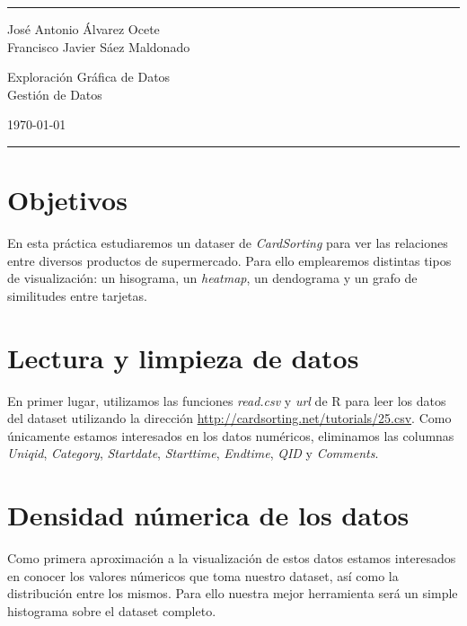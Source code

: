 \documentclass[a4paper]{article}
\begin{document}

\fancyhead[C]{}
\hrule \medskip %
\begin{minipage}{0.295\textwidth} 
	\raggedright
	\footnotesize
	José Antonio Álvarez Ocete \hfill\\   
	Francisco Javier Sáez Maldonado \hfill
\end{minipage}
\begin{minipage}{0.4\textwidth} 
	\centering 
	\large 
	Exploración Gráfica de Datos \\ 
	\normalsize 
	Gestión de Datos \\ 
\end{minipage}
\begin{minipage}{0.295\textwidth} 
	\raggedleft
	\today\hfill\\
\end{minipage}
\medskip\hrule 
\bigskip


\section{Objetivos}

En esta práctica estudiaremos un dataser de \emph{CardSorting} para ver las relaciones entre diversos productos de supermercado. Para ello emplearemos distintas tipos de visualización: un hisograma, un \emph{heatmap}, un dendograma y un grafo de similitudes entre tarjetas.

\section{Lectura y limpieza de datos}

En primer lugar, utilizamos las funciones \emph{read.csv} y \emph{url} de R para leer los datos del dataset utilizando la dirección \url{http://cardsorting.net/tutorials/25.csv}. Como únicamente estamos interesados en los datos numéricos, eliminamos las columnas \emph{Uniqid}, \emph{Category}, \emph{Startdate}, \emph{Starttime}, \emph{Endtime}, \emph{QID} y \emph{Comments}.

\section{Densidad númerica de los datos}

Como primera aproximación a la visualización de estos datos estamos interesados en conocer los valores númericos que toma nuestro dataset, así como la distribución entre los mismos. Para ello nuestra mejor herramienta será un simple histograma sobre el dataset completo.
\end{document}
